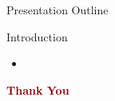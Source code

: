 \documentclass[aspectratio=169, 10pt]{beamer}
\begin{document}
\begin{frame}[plain]
    \titlepage
\end{frame}

\begin{frame}{Presentation Outline}
    \tableofcontents
\end{frame}

\begin{frame}{Introduction}
    \begin{itemize}
        \item 
    \end{itemize}
\end{frame}

\begin{frame}
    \begin{center}
        \vspace{2cm}
        \textbf{\textcolor{darkred}{\Huge Thank You}}
    \end{center}
\end{frame}
\end{document}
